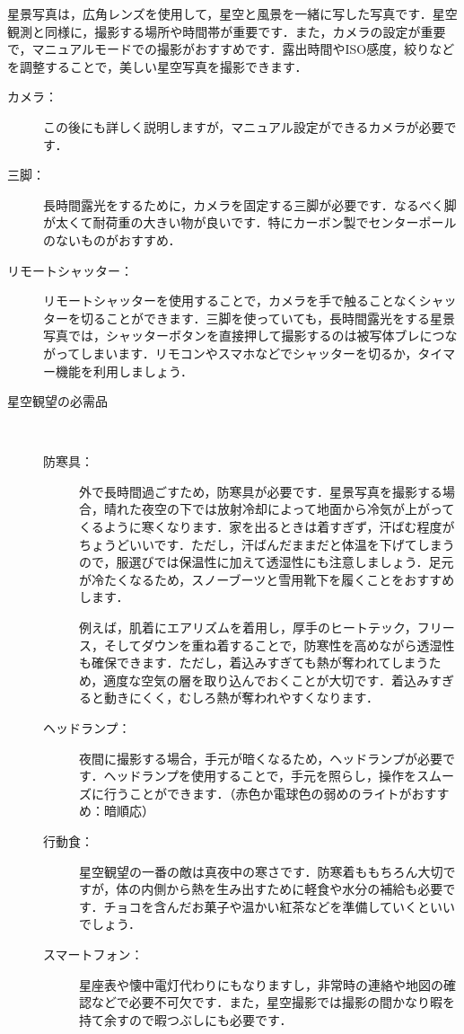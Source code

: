 \documentclass[main]{subfiles}
\begin{document}
星景写真は，広角レンズを使用して，星空と風景を一緒に写した写真です．星空観測と同様に，撮影する場所や時間帯が重要です．また，カメラの設定が重要で，マニュアルモードでの撮影がおすすめです．露出時間やISO感度，絞りなどを調整することで，美しい星空写真を撮影できます．

\begin{tcolorbox}[title=星景写真に必要な物, breakable]
    \begin{description}
        \item[カメラ：]この後にも詳しく説明しますが，マニュアル設定ができるカメラが必要です．
        \item[三脚：]長時間露光をするために，カメラを固定する三脚が必要です．なるべく脚が太くて耐荷重の大きい物が良いです．特にカーボン製でセンターポールのないものがおすすめ．
        \item[リモートシャッター：]リモートシャッターを使用することで，カメラを手で触ることなくシャッターを切ることができます．三脚を使っていても，長時間露光をする星景写真では，シャッターボタンを直接押して撮影するのは被写体ブレにつながってしまいます．リモコンやスマホなどでシャッターを切るか，タイマー機能を利用しましょう．
        \item[星空観望の必需品] \mbox{}\\
            \begin{description}
                \item[防寒具：] 外で長時間過ごすため，防寒具が必要です．星景写真を撮影する場合，晴れた夜空の下では放射冷却によって地面から冷気が上がってくるように寒くなります．家を出るときは着すぎず，汗ばむ程度がちょうどいいです．ただし，汗ばんだままだと体温を下げてしまうので，服選びでは保温性に加えて透湿性にも注意しましょう．足元が冷たくなるため，スノーブーツと雪用靴下を履くことをおすすめします．\mbox{}\par
                    例えば，肌着にエアリズムを着用し，厚手のヒートテック，フリース，そしてダウンを重ね着することで，防寒性を高めながら透湿性も確保できます．ただし，着込みすぎても熱が奪われてしまうため，適度な空気の層を取り込んでおくことが大切です．着込みすぎると動きにくく，むしろ熱が奪われやすくなります．
                \item[ヘッドランプ：] 夜間に撮影する場合，手元が暗くなるため，ヘッドランプが必要です．ヘッドランプを使用することで，手元を照らし，操作をスムーズに行うことができます．（赤色か電球色の弱めのライトがおすすめ：暗順応）
                \item[行動食：] 星空観望の一番の敵は真夜中の寒さです．防寒着ももちろん大切ですが，体の内側から熱を生み出すために軽食や水分の補給も必要です．チョコを含んだお菓子や温かい紅茶などを準備していくといいでしょう．
                \item[スマートフォン：] 星座表や懐中電灯代わりにもなりますし，非常時の連絡や地図の確認などで必要不可欠です．また，星空撮影では撮影の間かなり暇を持て余すので暇つぶしにも必要です．
            \end{description}
    \end{description}
\end{tcolorbox}
\end{document}
